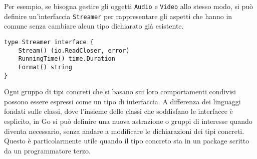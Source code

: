 \documentclass[../../thesis.tex]{subfiles}
\begin{document}
    Per esempio, se bisogna gestire gli oggetti \verb"Audio" e \verb"Video" allo stesso modo, si può definire un'interfaccia \verb"Streamer" per rappresentare gli aspetti che hanno in comune senza cambiare alcun tipo dichiarato già esistente.
    \begin{lstlisting}[frame = single,label={lst:lstlisting6-3.7}]
type Streamer interface {
    Stream() (io.ReadCloser, error)
    RunningTime() time.Duration
    Format() string
}
    \end{lstlisting}
    Ogni gruppo di tipi concreti che si basano sui loro comportamenti condivisi possono essere espressi come un tipo di interfaccia.
    A differenza dei linguaggi fondati sulle classi, dove l'insieme delle classi che soddisfano le interfacce è esplicito, in Go si può definire una nuova astrazione o gruppi di interesse quando diventa necessario, senza andare a modificare le dichiarazioni dei tipi concreti.
    Questo è particolarmente utile quando il tipo concreto sta in un package scritto da un programmatore terzo.
\end{document}
